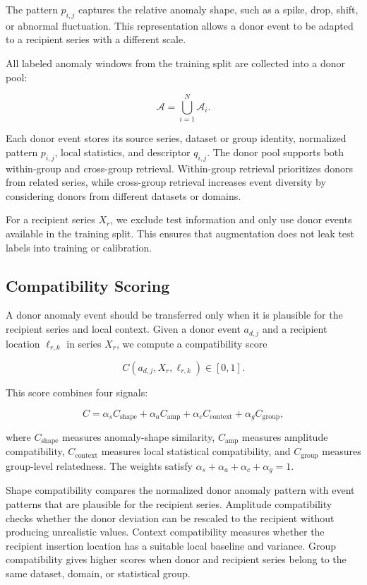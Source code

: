 \documentclass[conference]{IEEEtran}
\begin{document}
The pattern $p_{i,j}$ captures the relative anomaly shape, such as a spike, drop, shift, or abnormal fluctuation. This representation allows a donor event to be adapted to a recipient series with a different scale.

All labeled anomaly windows from the training split are collected into a donor pool:

\[
\mathcal{A}
=
\bigcup_{i=1}^{N}\mathcal{A}_i.
\]

Each donor event stores its source series, dataset or group identity, normalized pattern $p_{i,j}$, local statistics, and descriptor $q_{i,j}$. The donor pool supports both within-group and cross-group retrieval. Within-group retrieval prioritizes donors from related series, while cross-group retrieval increases event diversity by considering donors from different datasets or domains.

For a recipient series $X_r$, we exclude test information and only use donor events available in the training split. This ensures that augmentation does not leak test labels into training or calibration.


\subsection{Compatibility Scoring}
A donor anomaly event should be transferred only when it is plausible for the recipient series and local context. Given a donor event $a_{d,j}$ and a recipient location $\ell_{r,k}$ in series $X_r$, we compute a compatibility score

\[
C(a_{d,j},X_r,\ell_{r,k})\in[0,1].
\]

This score combines four signals:

\[
C
=
\alpha_s C_{\mathrm{shape}}
+
\alpha_a C_{\mathrm{amp}}
+
\alpha_c C_{\mathrm{context}}
+
\alpha_g C_{\mathrm{group}},
\]

where $C_{\mathrm{shape}}$ measures anomaly-shape similarity, $C_{\mathrm{amp}}$ measures amplitude compatibility, $C_{\mathrm{context}}$ measures local statistical compatibility, and $C_{\mathrm{group}}$ measures group-level relatedness. The weights satisfy $\alpha_s+\alpha_a+\alpha_c+\alpha_g=1$.

Shape compatibility compares the normalized donor anomaly pattern with event patterns that are plausible for the recipient series. Amplitude compatibility checks whether the donor deviation can be rescaled to the recipient without producing unrealistic values. Context compatibility measures whether the recipient insertion location has a suitable local baseline and variance. Group compatibility gives higher scores when donor and recipient series belong to the same dataset, domain, or statistical group.
\end{document}
